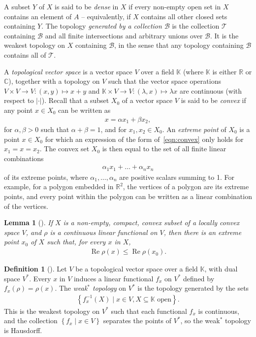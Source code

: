 \documentclass[11pt,a4paper]{report}
\theoremstyle{plain}
\newtheorem{lemma}{Lemma}
\theoremstyle{definition}
\newtheorem*{defn*}{Definition}
\newcommand{\1}{\mathbbm{1}}
\newcommand{\C}{\mathbb{C}}
\newcommand{\R}{\mathbb{R}}
\newcommand{\B}{\mathcal{B}}
\newcommand{\T}{\mathcal{T}}
\DeclareMathOperator{\Real}{\operatorname{Re}}
\begin{document}
A subset $Y$ of $X$ is said to be \emph{dense} in $X$ if every non-empty open set 
in $X$ contains an element of $A$ -- equivalently, if $X$ contains all other closed 
sets containing $Y$. The topology \emph{generated by a collection $\B$} is the 
collection $\T$ containing $\B$ and all finite intersections and arbitrary 
unions over $\B$. It is the weakest topology on $X$ containing $\B$, in the 
sense that any topology containing $\B$ contains all of $\T$.

A \emph{topological vector space} is a vector space $V$ over a field 
$\mathbb{K}$ (where $\mathbb{K}$ is either $\R$ or $\C$),
together with a topology on $V$ such that the vector space operations $V\times 
V\to V:(x,y)\mapsto x+y$ and $\mathbb{K}\times V\to V:(\lambda,x)\mapsto \lambda 
x$ are continuous (with respect to $\left|\cdot\right|$). 
Recall that a subset $X_0$ of a vector space $V$ is said to be 
\emph{convex} if any point $x \in X_0$ can be written as 
\begin{align}\label{eqn:convex}
	x = \alpha x_1 +\beta x_2,
\end{align}
for $\alpha,\beta> 0$ such that $\alpha+\beta=1$, and for $x_1,x_2\in X_0$.
An \emph{extreme point} of $X_0$ is a point $x \in X_0$ for which an expression 
of the form of~\eqref{eqn:convex} only holds for $x_1 = x = x_2$.
The convex set $X_0$ is then equal to the set of all  finite linear combinations
\begin{align*}
	\alpha_1 x_1+\dots +\alpha_n x_n
\end{align*}
of its extreme points, where $\alpha_1,\dots,\alpha_n$ are positive scalars 
summing to 1. For example, for a polygon embedded in $\R^2$, the vertices of a 
polygon are its extreme points, and every point within the polygon can be 
written as a linear combination of the vertices.


\begin{lemma}[{\cite[1.4.4]{kadison83}}]\label{lemma:144}
If $X$ is a non-empty, compact, convex subset of a locally convex space $V$, and 
$\rho$ is a continuous linear functional on $V$, then there is an extreme point 
$x_0$ of $X$ such that, for every $x$ in $X$,
	\begin{align*}
		\Real\rho(x) \leq \Real\rho(x_0).
	\end{align*}
\end{lemma}

\begin{defn*}[{\cite[3.14]{rudin91}}]
	Let $V$ be a topological vector space over a field $\mathbb K$, with dual 
	space $V^\ast$. Every $x$ in $V$ induces a linear functional $f_x$ on $V^\ast$ 
	defined by $f_x(\rho)=\rho(x)$. The \emph{weak$^\ast$ topology} on $V^\ast$ is 
	the topology generated by the sets 
	\begin{align*}
		\left\{f^{-1}_x(X) \mid x \in V, X\subseteq \mathbb K \mbox{ open}\right\}.
	\end{align*}
	This is the weakest topology on $V^\ast$ such that each functional $f_x$ is 
	continuous, and the collection $\left\{f_x \mid x\in V\right\}$ separates the 
	points of $V^\ast$, so the weak$^\ast$ topology is Hausdorff.
\end{defn*}
\end{document}
